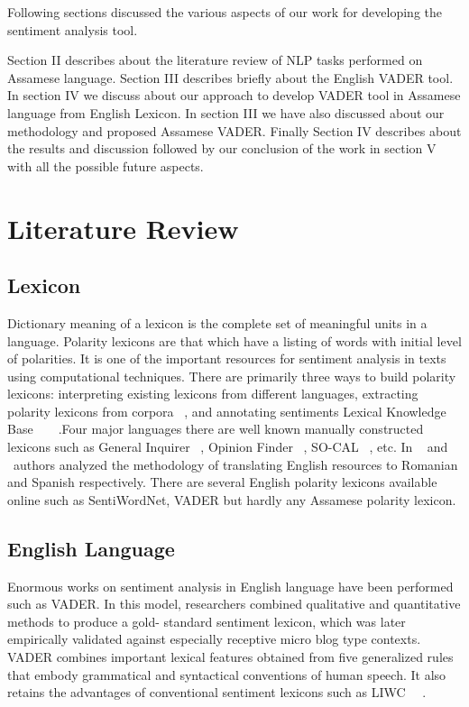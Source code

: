 \documentclass[conference]{IEEEtran}
\begin{document}
Following sections discussed the various aspects of our work for developing the sentiment analysis tool.

Section II describes about the literature review of NLP tasks performed on Assamese language. Section III describes briefly about the English VADER tool. In section IV we discuss about our approach to develop VADER tool in Assamese language from English Lexicon. In section III we have also discussed about our methodology and proposed Assamese VADER. Finally Section IV describes about the results and discussion followed by our conclusion of the work in section V with all the possible future aspects.

\section{Literature Review}

\subsection{Lexicon}

Dictionary meaning of a lexicon is the complete set of meaningful units in a language. Polarity lexicons are that which have a listing of words with initial level of polarities. It is one of the important resources for sentiment analysis in texts using computational techniques. There are primarily three ways to build polarity lexicons: interpreting existing lexicons from different languages, extracting polarity lexicons from corpora ~\cite{b4}, and annotating sentiments Lexical Knowledge Base~\cite{b5}~\cite{b6}~\cite{b7}~\cite{b8}.Four major languages there are well known manually constructed lexicons such as General Inquirer ~\cite{b9}, Opinion Finder ~\cite{b10}, SO-CAL ~\cite{b11}, etc. In ~\cite{b12} and ~\cite{b13}authors analyzed the methodology of translating English resources to Romanian and Spanish respectively. There are several English polarity lexicons available online such as SentiWordNet, VADER but hardly any Assamese polarity lexicon.

\subsection{English Language}

Enormous works on sentiment analysis in English language have been performed such as VADER. In this model, researchers combined qualitative and quantitative methods to produce a gold- standard sentiment lexicon, which was later empirically validated against especially receptive micro blog type contexts. VADER combines important lexical features obtained from five generalized rules that embody grammatical and syntactical conventions of human speech. It also retains the advantages of conventional sentiment lexicons such as LIWC ~\cite{b14}~\cite{b15}.
\end{document}
